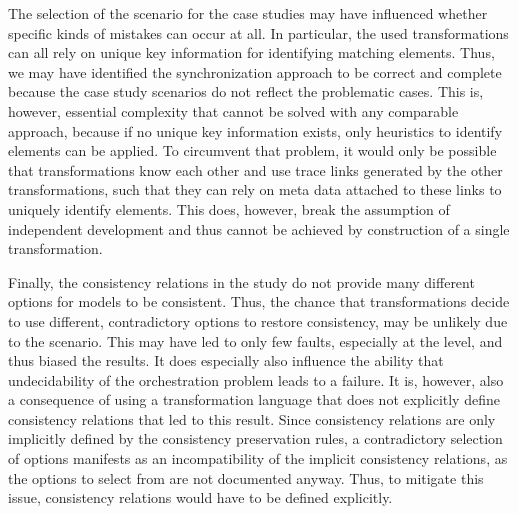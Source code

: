 
The selection of the scenario for the case studies may have influenced whether specific kinds of mistakes can occur at all.
In particular, the used transformations can all rely on unique key information for identifying matching elements.
Thus, we may have identified the synchronization approach to be correct and complete because the case study scenarios do not reflect the problematic cases.
This is, however, essential complexity that cannot be solved with any comparable approach, because if no unique key information exists, only heuristics to identify elements can be applied.
To circumvent that problem, it would only be possible that transformations know each other and use trace links generated by the other transformations, such that they can rely on meta data attached to these links to uniquely identify elements.
This does, however, break the assumption of independent development and thus cannot be achieved by construction of a single transformation.

Finally, the consistency relations in the study do not provide many different options for models to be consistent.
Thus, the chance that transformations decide to use different, contradictory options to restore consistency, may be unlikely due to the scenario.
This may have led to only few faults, especially at the \levelnetworkrule level, and thus biased the results.
It does especially also influence the ability that undecidability of the orchestration problem leads to a failure.
It is, however, also a consequence of using a transformation language that does not explicitly define consistency relations that led to this result.
Since consistency relations are only implicitly defined by the consistency preservation rules, a contradictory selection of options manifests as an incompatibility of the implicit consistency relations, as the options to select from are not documented anyway.
Thus, to mitigate this issue, consistency relations would have to be defined explicitly.


